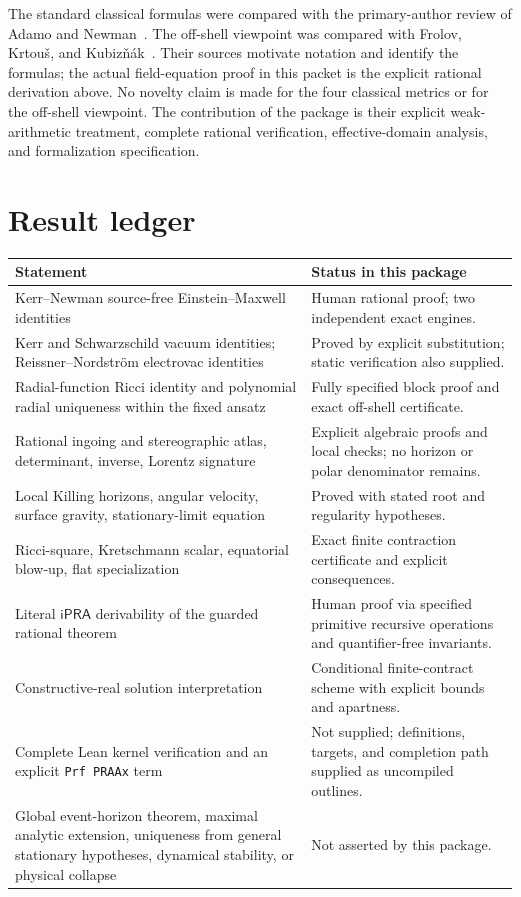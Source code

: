\documentclass[11pt,a4paper]{article}
\numberwithin{equation}{section}
\theoremstyle{definition}\newtheorem{definition}[theorem]{Definition}
\theoremstyle{remark}\newtheorem{remark}[theorem]{Remark}
\newcommand{\ipra}{\mathsf{iPRA}}
\begin{document}
The standard classical formulas were compared with the primary-author review of Adamo and Newman~\cite{adamo}. The off-shell viewpoint was compared with Frolov, Krtou\v{s}, and Kubiz\v{n}\'ak~\cite{frolov}. Their sources motivate notation and identify the formulas; the actual field-equation proof in this packet is the explicit rational derivation above. No novelty claim is made for the four classical metrics or for the off-shell viewpoint. The contribution of the package is their explicit weak-arithmetic treatment, complete rational verification, effective-domain analysis, and formalization specification.

\section{Result ledger}\label{sec:ledger}
\begin{longtable}{>{\raggedright\arraybackslash}p{}>{\raggedright\arraybackslash}p{}}
\toprule
Statement & Status in this package\\\midrule\endhead
Kerr--Newman source-free Einstein--Maxwell identities & Human rational proof; two independent exact engines.\\[0.4em]
Kerr and Schwarzschild vacuum identities; Reissner--Nordstr\"om electrovac identities & Proved by explicit substitution; static verification also supplied.\\[0.4em]
Radial-function Ricci identity and polynomial radial uniqueness within the fixed ansatz & Fully specified block proof and exact off-shell certificate.\\[0.4em]
Rational ingoing and stereographic atlas, determinant, inverse, Lorentz signature & Explicit algebraic proofs and local checks; no horizon or polar denominator remains.\\[0.4em]
Local Killing horizons, angular velocity, surface gravity, stationary-limit equation & Proved with stated root and regularity hypotheses.\\[0.4em]
Ricci-square, Kretschmann scalar, equatorial blow-up, flat specialization & Exact finite contraction certificate and explicit consequences.\\[0.4em]
Literal $\ipra$ derivability of the guarded rational theorem & Human proof via specified primitive recursive operations and quantifier-free invariants.\\[0.4em]
Constructive-real solution interpretation & Conditional finite-contract scheme with explicit bounds and apartness.\\[0.4em]
Complete Lean kernel verification and an explicit \texttt{Prf PRAAx} term & Not supplied; definitions, targets, and completion path supplied as uncompiled outlines.\\[0.4em]
Global event-horizon theorem, maximal analytic extension, uniqueness from general stationary hypotheses, dynamical stability, or physical collapse & Not asserted by this package.\\\bottomrule
\end{longtable}
\end{document}
